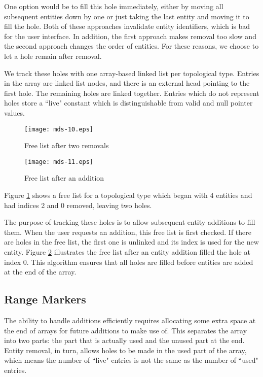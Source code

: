 \documentclass{article}
\begin{document}
One option would be to fill this hole immediately, either by
moving all subsequent entities down by one or just taking the last entity
and moving it to fill the hole.
Both of these approaches invalidate entity identifiers, which
is bad for the user interface.
In addition, the first approach makes removal too slow
and the second approach changes the order of entities.
For these reasons, we choose to let a hole remain after removal.

We track these holes with one array-based linked list per
topological type.
Entries in the array are linked list nodes, and there is
an external head pointing to the first hole.
The remaining holes are linked together.
Entries which do not represent holes store a ``live"
constant which is distinguishable from valid and
null pointer values.

\begin{figure}[ht!]
\centering
\texttt{[image: mds-10.eps]}
\caption{Free list after two removals}
\label{fig:free1}
\end{figure}

\begin{figure}[ht!]
\centering
\texttt{[image: mds-11.eps]}
\caption{Free list after an addition}
\label{fig:free2}
\end{figure}

Figure \ref{fig:free1} shows a free list for a topological
type which began with 4 entities and had indices 2 and
0 removed, leaving two holes.

The purpose of tracking these holes is to allow subsequent
entity additions to fill them.
When the user requests an addition, this free list is first
checked.
If there are holes in the free list, the first one is unlinked
and its index is used for the new entity.
Figure \ref{fig:free2} illustrates the free list after an
entity addition filled the hole at index 0.
This algorithm ensures that all holes are filled before entities are added
at the end of the array.

\subsection{Range Markers}

The ability to handle additions efficiently requires allocating
some extra space at the end of arrays for future additions
to make use of. 
This separates the array into two parts: the part that is actually
used and the unused part at the end.
Entity removal, in turn, allows holes to be made in the used part
of the array, which means the number of ``live" entries is not
the same as the number of ``used" entries.
\end{document}
